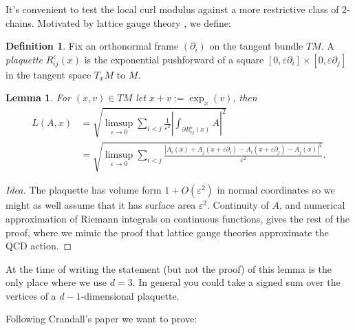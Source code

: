 \documentclass[reqno,11pt]{amsart}
\newcommand{\dfn}[1]{\emph{#1}\index{#1}}
\newtheorem{lemma}[theorem]{Lemma}
\theoremstyle{definition}
\newtheorem{definition}[theorem]{Definition}
\numberwithin{equation}{section}
\begin{document}
It's convenient to test the local curl modulus against a more restrictive class of $2$-chains.
Motivated by lattice gauge theory \cite{Gupta98}, we define:

\begin{definition}
Fix an orthonormal frame $(\partial_i)$ on the tangent bundle $TM$.
A \dfn{plaquette} $R_{ij}^\varepsilon(x)$ is the exponential pushforward of a square $[0, \varepsilon \partial_i] \times [0, \varepsilon \partial_j]$ in the tangent space $T_x M$ to $M$.
\end{definition}

\begin{lemma}
For $(x, v) \in TM$ let $x + v := \exp_x(v)$, then
\begin{align*}
	L(A, x) 
	&= \sqrt{\limsup_{\varepsilon \to 0} \sum_{i < j} \frac{1}{\varepsilon^2} \left|\int_{\partial R_{ij}^\varepsilon(x)} A\right|^2}\\
	&= \sqrt{\limsup_{\varepsilon \to 0} \sum_{i < j} \frac{|A_i(x) + A_j(x + \varepsilon \partial_i) - A_i(x + \varepsilon \partial_j) - A_j(x)|^2}{\varepsilon^2}}.
\end{align*}
\end{lemma}
\begin{proof}[Idea]
The plaquette has volume form $1 + O(\varepsilon^2)$ in normal coordinates so we might as well assume that it has surface area $\varepsilon^2$.
Continuity of $A$, and numerical approximation of Riemann integrals on continuous functions, gives the rest of the proof, where we mimic the proof that lattice gauge theories approximate the QCD action.
\end{proof}

At the time of writing the statement (but not the proof) of this lemma is the only place where we use $d = 3$.
In general you could take a signed sum over the vertices of a $d-1$-dimensional plaquette.

Following Crandall's paper we want to prove:
\end{document}
